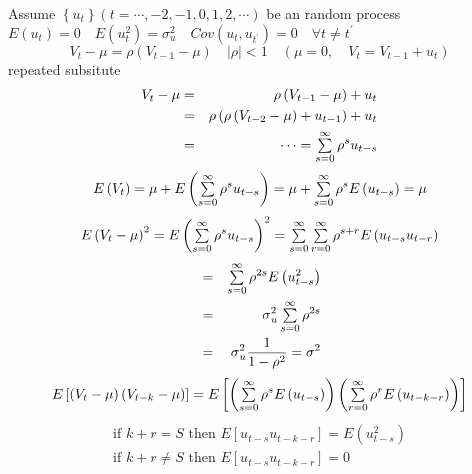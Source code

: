 \documentclass{article}
\begin{document}
Assume $\left\{ u_{t}\right\} \left( t=\cdots ,-2,-1,0,1,2,\cdots \right) $
be an random process $E\left( u_{t}\right) =0\quad E\left( u_{t}^{2}\right)
=\sigma _{u}^{2}\quad Cov\left( u_{t},u_{t^{\prime }}\right) =0\quad \forall
t\neq t^{\prime }$%
\begin{equation*}
V_{t}-\mu =\rho \left( V_{t-1}-\mu \right) \quad \left\vert \rho \right\vert
<1\quad \left( \mu =0,\quad V_{t}=V_{t-1}+u_{t}\right) 
\end{equation*}%
repeated subsitute%
\begin{eqnarray*}
V_{t}-\mu  &=&\rho \left( V_{t-1}-\mu \right) +u_{t} \\
&=&\rho \left( \rho \left( V_{t-2}-\mu \right) +u_{t-1}\right) +u_{t} \\
&=&\cdots =\tsum\limits_{s=0}^{\infty }\rho ^{s}u_{t-s}
\end{eqnarray*}%
\begin{equation*}
E\left( V_{t}\right) =\mu +E\left( \tsum\limits_{s=0}^{\infty }\rho
^{s}u_{t-s}\right) =\mu +\tsum\limits_{s=0}^{\infty }\rho ^{s}E\left(
u_{t-s}\right) =\mu 
\end{equation*}%
\begin{equation*}
E\left( V_{t}-\mu \right) ^{2}=E\left( \tsum\limits_{s=0}^{\infty }\rho
^{s}u_{t-s}\right) ^{2}=\tsum\limits_{s=0}^{\infty
}\tsum\limits_{r=0}^{\infty }\rho ^{s+r}E\left( u_{t-s}u_{t-r}\right) 
\end{equation*}%
\begin{eqnarray*}
&=&\tsum\limits_{s=0}^{\infty }\rho ^{2s}E\left( u_{t-s}^{2}\right)  \\
&=&\sigma _{u}^{2}\tsum\limits_{s=0}^{\infty }\rho ^{2s} \\
&=&\sigma _{u}^{2}\frac{1}{1-\rho ^{2}}=\sigma ^{2}
\end{eqnarray*}%
\begin{equation*}
E\left[ \left( V_{t}-\mu \right) \left( V_{t-k}-\mu \right) \right] =E\left[
\left( \tsum\limits_{s=0}^{\infty }\rho ^{s}E\left( u_{t-s}\right) \right)
\left( \tsum\limits_{r=0}^{\infty }\rho ^{r}E\left( u_{t-k-r}\right) \right) %
\right] 
\end{equation*}%
\begin{equation*}
\begin{array}{c}
\text{if }k+r=S\text{ then }E\left[ u_{t-s}u_{t-k-r}\right] =E\left(
u_{t-s}^{2}\right)  \\ 
\text{if }k+r\neq S\text{ then }E\left[ u_{t-s}u_{t-k-r}\right] =0%
\end{array}%
\end{equation*}%
\end{document}
